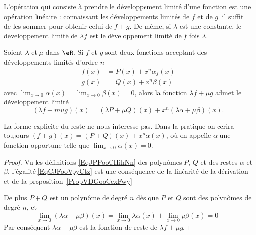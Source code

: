 L'opération qui consiste à prendre le développement limité d'une fonction est une opération linéaire : connaissant les développements limités de \( f\) et de \( g\), il suffit de les sommer pour obtenir celui de \( f+g\). De m\^eme, si \( \lambda\) est une constante, le développement limité de \( \lambda f\) est le développement limité de \( f\) fois \( \lambda\).
\begin{proposition}     \label{PROPooAUVPooGRIZYF}
	Soient \( \lambda\) et \( \mu\) dans \( \eR\).  Si \( f\) et \( g\) sont deux fonctions acceptant des développements limités d'ordre \( n\)
	\begin{subequations}    \label{EqJPPooCHihNn}
		\begin{align}
			f(x) & =P(x)+x^n\alpha_f(x) \\
			g(x) & =Q(x)+x^n\beta(x)
		\end{align}
	\end{subequations}
	avec \( \lim_{x\to 0} \alpha(x)=\lim_{x\to 0} \beta(x)=0\), alors la fonction \( \lambda f+\mu g\) admet le développement limité
	\begin{equation}    \label{EqCJFooVpyCtz}
		(\lambda f+mu g)(x)=(\lambda P+\mu Q)(x)+x^n(\lambda \alpha+\mu\beta)(x).
	\end{equation}
\end{proposition}
\begin{remark}
	La forme explicite du reste ne nous interesse pas. Dans la pratique on écrira toujours \( (f+g)(x)=(P+Q)(x)+x^n\alpha(x)\), où on appelle \( \alpha\) une fonction opportune telle que \( \lim_{x\to 0} \alpha(x)=0\).
\end{remark}
\begin{proof}
	Vu les définitions \eqref{EqJPPooCHihNn} des polynômes \( P\), \( Q\) et des restes \( \alpha\) et \( \beta\), l'égalité \eqref{EqCJFooVpyCtz} est une conséquence de la linéarité de la dérivation et de la proposition~\ref{PropVDGooCexFwy}

	De plus \( P+Q\) est un polynôme de degré \( n\) dès que \( P\) et \( Q\) sont des polynômes de degré \( n\), et
	\begin{equation}
		\lim_{x\to 0} (\lambda \alpha+\mu\beta)(x)=\lim_{x\to 0} \lambda\alpha(x)+\lim_{x\to 0} \mu\beta(x)=0.
	\end{equation}
	Par conséquent \(\lambda \alpha+\mu\beta\) est la fonction de reste de \( \lambda f+\mu g\).
\end{proof}

